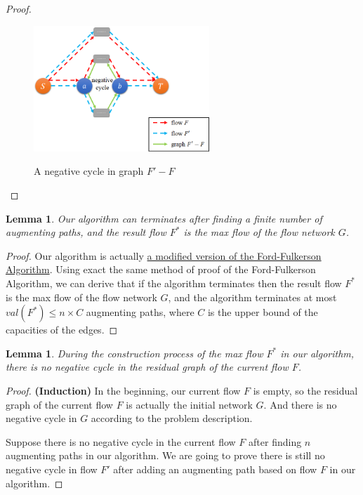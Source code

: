 \documentclass[12pt,a4paper]{article}
\newtheorem{lemma}[theorem]{Lemma}
\theoremstyle{definition}
\begin{document}
\begin{enumerate}
\begin{proof}
\begin{itemize}
        \begin{figure}[htbp]
          \centering
          \includegraphics[width=2.6in]{pics/prob3-2.png}\\
          \caption{A negative cycle in graph $F' - F$} \label{fig3-2}
        \end{figure}
    \end{itemize}
    \end{proof}

    \begin{lemma}\label{lemma2}
    Our algorithm can terminates after finding a finite number of augmenting paths, and the result flow $F^*$ is the max flow of the flow network $G$.
    \end{lemma}
    \begin{proof}
    Our algorithm is actually \underline{a modified version of the Ford-Fulkerson Algorithm}. Using exact the same method of proof of the Ford-Fulkerson Algorithm, we can derive that if the algorithm terminates then the result flow $F^*$ is the max flow of the flow network $G$, and the algorithm terminates at most $val(F^*) \leq n \times C$ augmenting paths, where $C$ is the upper bound of the capacities of the edges.
    \end{proof}

    \begin{lemma}\label{lemma3}
    During the construction process of the max flow $F^*$ in our algorithm, there is no negative cycle in the residual graph of the current flow $F$.
    \end{lemma}

    \begin{proof}
    \textbf{(Induction)} In the beginning, our current flow $F$ is empty, so the residual graph of the current flow $F$ is actually the initial network $G$. And there is no negative cycle in $G$ according to the problem description.

    Suppose there is no negative cycle in the current flow $F$ after finding $n$ augmenting paths in our algorithm. We are going to prove there is still no negative cycle in flow $F'$ after adding an augmenting path based on flow $F$ in our algorithm.


\end{proof}
\end{enumerate}
\end{document}
